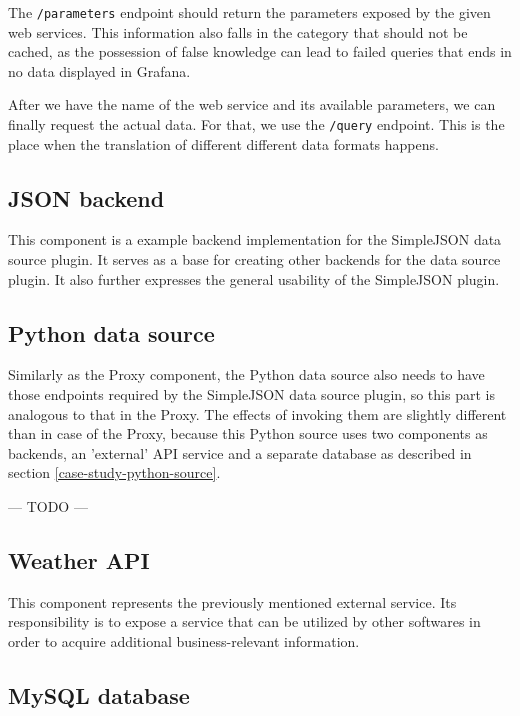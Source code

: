 The \texttt{/parameters} endpoint should return the parameters exposed by the given web services. This information also falls in the category that should not be cached, as the possession of false knowledge can lead to failed queries that ends in no data displayed in Grafana.

After we have the name of the web service and its available parameters, we can finally request the actual data. For that, we use the \texttt{/query} endpoint. This is the place when the translation of different different data formats happens.

\subsection{JSON backend}
This component is a example backend implementation for the SimpleJSON data source plugin. It serves as a base for creating other backends for the data source plugin. It also further expresses the general usability of the SimpleJSON plugin.

\subsection{Python data source}

Similarly as the Proxy component, the Python data source also needs to have those endpoints required by the SimpleJSON data source plugin, so this part is analogous to that in the Proxy. The effects of invoking them are slightly different than in case of the Proxy, because this Python source uses two components as backends, an 'external' API service and a separate database as described in section \ref{case-study-python-source}.


\begin{center}
	--- TODO ---
\end{center}


\subsection{Weather API}

This component represents the previously mentioned external service. Its responsibility is to expose a service that can be utilized by other softwares in order to acquire additional business-relevant information.

\subsection{MySQL database}

